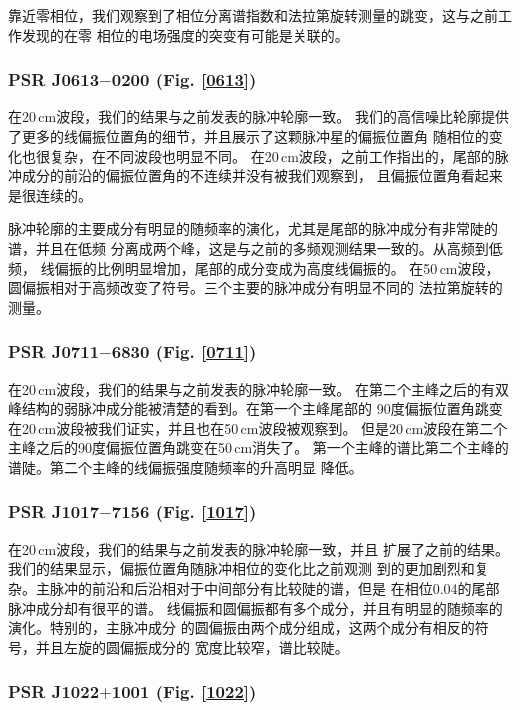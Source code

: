 靠近零相位，我们观察到了相位分离谱指数和法拉第旋转测量的跳变，这与之前工作发现的在零
相位的电场强度的突变有可能是关联的\supercite{Oslowski14}。

\subsubsection{PSR J0613$-$0200 (Fig. \ref{0613})}

在20\,cm波段，我们的结果与之前发表的脉冲轮廓一致\supercite{Ord04,Yan11a}。
我们的高信噪比轮廓提供了更多的线偏振位置角的细节，并且展示了这颗脉冲星的偏振位置角
随相位的变化也很复杂，在不同波段也明显不同。
%
在20\,cm波段，之前工作指出的，尾部的脉冲成分的前沿的偏振位置角的不连续并没有被我们观察到\supercite{Yan11a}，
且偏振位置角看起来是很连续的。

脉冲轮廓的主要成分有明显的随频率的演化，尤其是尾部的脉冲成分有非常陡的谱，并且在低频
分离成两个峰，这是与之前的多频观测结果一致的\supercite{Stairs99}。从高频到低频，
线偏振的比例明显增加，尾部的成分变成为高度线偏振的。
%
在50\,cm波段，圆偏振相对于高频改变了符号。三个主要的脉冲成分有明显不同的
法拉第旋转的测量。


\subsubsection{PSR J0711$-$6830 (Fig. \ref{0711})}

在20\,cm波段，我们的结果与之前发表的脉冲轮廓一致\supercite{Ord04,Yan11a}。
在第二个主峰之后的有双峰结构的弱脉冲成分能被清楚的看到。在第一个主峰尾部的
90度偏振位置角跳变在20\,cm波段被我们证实，并且也在50\,cm波段被观察到。
但是20\,cm波段在第二个主峰之后的90度偏振位置角跳变在50\,cm消失了。
%
第一个主峰的谱比第二个主峰的谱陡。第二个主峰的线偏振强度随频率的升高明显
降低。

\subsubsection{PSR J1017$-$7156 (Fig. \ref{1017})}

在20\,cm波段，我们的结果与之前发表的脉冲轮廓一致\supercite{Keith12}，并且
扩展了之前的结果。我们的结果显示，偏振位置角随脉冲相位的变化比之前观测
到的更加剧烈和复杂。主脉冲的前沿和后沿相对于中间部分有比较陡的谱，但是
在相位0.04的尾部脉冲成分却有很平的谱。
%
线偏振和圆偏振都有多个成分，并且有明显的随频率的演化。特别的，主脉冲成分
的圆偏振由两个成分组成，这两个成分有相反的符号，并且左旋的圆偏振成分的
宽度比较窄，谱比较陡。

\subsubsection{PSR J1022$+$1001 (Fig. \ref{1022})}

